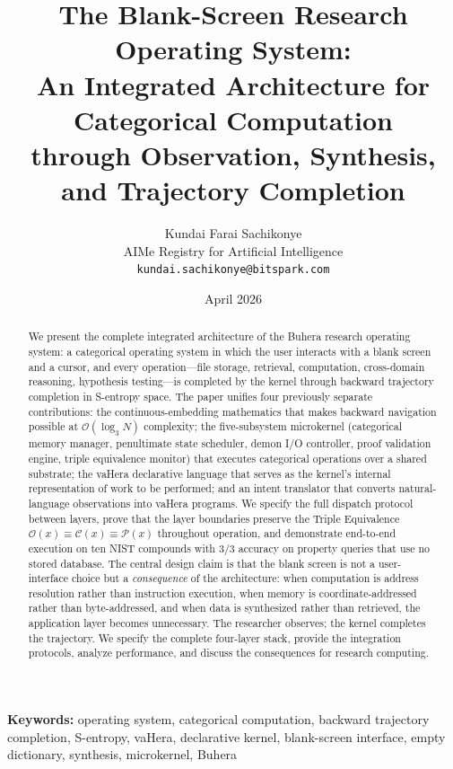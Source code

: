 \documentclass[11pt,twocolumn,a4paper]{article}
\title{\textbf{The Blank-Screen Research Operating System:\\[4pt]
An Integrated Architecture for Categorical Computation\\[4pt]
through Observation, Synthesis, and Trajectory Completion}}
\author{
Kundai Farai Sachikonye\\
AIMe Registry for Artificial Intelligence\\
\texttt{kundai.sachikonye@bitspark.com}
}
\date{April 2026}
\begin{document}
\maketitle

\begin{abstract}
We present the complete integrated architecture of the Buhera research operating system: a categorical operating system in which the user interacts with a blank screen and a cursor, and every operation---file storage, retrieval, computation, cross-domain reasoning, hypothesis testing---is completed by the kernel through backward trajectory completion in S-entropy space. The paper unifies four previously separate contributions: the continuous-embedding mathematics that makes backward navigation possible at $\mathcal{O}(\log_3 N)$ complexity; the five-subsystem microkernel (categorical memory manager, penultimate state scheduler, demon I/O controller, proof validation engine, triple equivalence monitor) that executes categorical operations over a shared substrate; the vaHera declarative language that serves as the kernel's internal representation of work to be performed; and an intent translator that converts natural-language observations into vaHera programs. We specify the full dispatch protocol between layers, prove that the layer boundaries preserve the Triple Equivalence $\mathcal{O}(x) \equiv \mathcal{C}(x) \equiv \mathcal{P}(x)$ throughout operation, and demonstrate end-to-end execution on ten NIST compounds with $3/3$ accuracy on property queries that use no stored database. The central design claim is that the blank screen is not a user-interface choice but a \emph{consequence} of the architecture: when computation is address resolution rather than instruction execution, when memory is coordinate-addressed rather than byte-addressed, and when data is synthesized rather than retrieved, the application layer becomes unnecessary. The researcher observes; the kernel completes the trajectory. We specify the complete four-layer stack, provide the integration protocols, analyze performance, and discuss the consequences for research computing.
\end{abstract}

\vspace{6pt}
\noindent\textbf{Keywords:} operating system, categorical computation, backward trajectory completion, S-entropy, vaHera, declarative kernel, blank-screen interface, empty dictionary, synthesis, microkernel, Buhera

\tableofcontents
\end{document}

